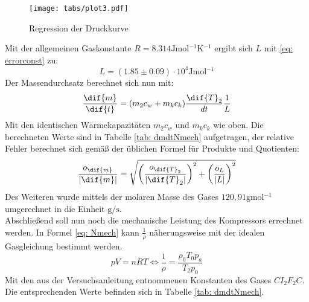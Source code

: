 \begin{figure}
  \centering
  \texttt{[image: tabs/plot3.pdf]}
  \caption{Regression der Druckkurve}
  \label{fig: plot3}
\end{figure}

Mit der allgemeinen Gaskonstante $R = 8.314\si{\joule \mol^{-1} \kelvin^{-1}}$ ergibt sich $L$  mit \eqref{eq: errorconst} zu: %
\begin{equation}
  L = (1.85 \pm 0.09)\cdot 10^{4} \si{\joule \mol^{-1}} %
\end{equation}
Der Massendurchsatz berechnet sich nun mit:
\begin{equation}
  \frac{\dif{m}}{\dif{t}} = (m_2 c_w + m_k c_k)\frac{\dif{T}_2}{dt} \frac{1}{L}
\end{equation}
Mit den identischen Wärmekapazitäten $m_2 c_w$ und $m_k c_k$ wie oben. Die berechneten Werte sind in Tabelle \ref{tab: dmdtNmech} aufgetragen, der relative Fehler berechnet sich gemäß der üblichen Formel
für Produkte und Quotienten:
\begin{equation}
  \frac{o_{\dif{m}}}{\left| \dif{m} \right|} = \sqrt{\left(\frac{o_{\dif{T}_2}}{\left| \dif{T}_2 \right|}\right)^2 + \left(\frac{o_{L}}{\left| L \right|}\right)^2} %
\end{equation}
Des Weiteren wurde mittels der molaren Masse des Gases $120,91 \si{\gram \mol ^{-1}}$ \cite{demtröder} umgerechnet in die Einheit $\si{\gram \per \second}$. \\%
Abschließend soll nun noch die mechanische Leistung des Kompressors errechnet werden. In Formel \eqref{eq: Nmech} kann $\frac{1}{\rho}$
näherungsweise mit der idealen Gasgleichung bestimmt werden.
\begin{equation}
  pV = nRT \Leftrightarrow  \frac{1}{\rho} = \frac{\rho_0 T_0 p_a}{T_2 p_0}
\end{equation}
Mit den aus der Versuchsanleitung \cite{anleitung206} entnommenen Konstanten des Gases $CI_2F_2C$. Die entsprechenden Werte befinden sich in Tabelle \ref{tab: dmdtNmech}.






